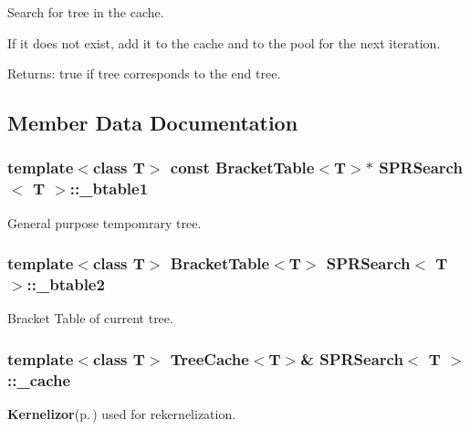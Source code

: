 Search for tree in the cache. 

If it does not exist, add it to the cache and to the pool for the next iteration. \begin{Desc}
\item[Returns:]true if tree corresponds to the end tree. \end{Desc}


\subsection{Member Data Documentation}
\subsubsection{\setlength{\rightskip}{0pt plus 5cm}template$<$class T$>$ const {\bf Bracket\-Table}$<$T$>$$\ast$ {\bf SPRSearch}$<$ T $>$::{\bf \_\-btable1}\hspace{0.3cm}{\tt  [protected]}}\label{classSPRSearch_p11}


General purpose tempomrary tree. 

\subsubsection{\setlength{\rightskip}{0pt plus 5cm}template$<$class T$>$ {\bf Bracket\-Table}$<$T$>$ {\bf SPRSearch}$<$ T $>$::{\bf \_\-btable2}\hspace{0.3cm}{\tt  [protected]}}\label{classSPRSearch_p12}


Bracket Table of current tree. 

\subsubsection{\setlength{\rightskip}{0pt plus 5cm}template$<$class T$>$ {\bf Tree\-Cache}$<$T$>$\& {\bf SPRSearch}$<$ T $>$::{\bf \_\-cache}\hspace{0.3cm}{\tt  [protected]}}\label{classSPRSearch_p7}


{\bf Kernelizor}{\rm (p.\,\pageref{classKernelizor})} used for rekernelization. 

